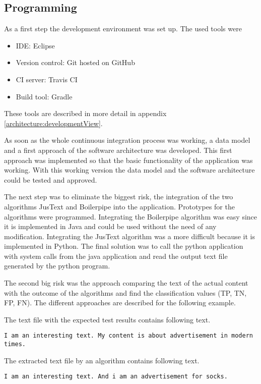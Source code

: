 \subsection{Programming}

As a first step the development environment was set up. The used tools were

\begin{itemize}
\item IDE: Eclipse
\item Version control: Git hosted on GitHub
\item CI server: Travis CI
\item Build tool: Gradle
\end{itemize}

These tools are described in more detail in appendix \ref{architecture:developmentView}. 

As soon as the whole continuous integration process was working, a data model and a first approach of the software architecture was developed. This first approach was implemented so that the basic functionality of the application was working. With this working version the data model and the software architecture could be tested and approved.

The next step was to eliminate the biggest risk, the integration of the two algorithms JusText and Boilerpipe into the application. Prototypes for the algorithms were programmed. Integrating the Boilerpipe algorithm \cite{algo:boilerpipe}  was easy since it is implemented in Java and could be used without the need of any modification. Integrating the JusText algorithm \cite{algo:justext} was a more difficult because it is implemented in Python. The final solution was to call the python application with system calls from the java application and read the output text file generated by the python program.

The second big risk was the approach comparing the text of the actual content with the outcome of the algorithms and find the classification values (TP, TN, FP, FN). The different approaches are described for the following example.


The text file with the expected test results contains following text.


\texttt{I am an interesting text. My content is about advertisement in modern times.}

The extracted text file by an algorithm contains following text.

\texttt{I am an interesting text. And i am an advertisement for socks. }

